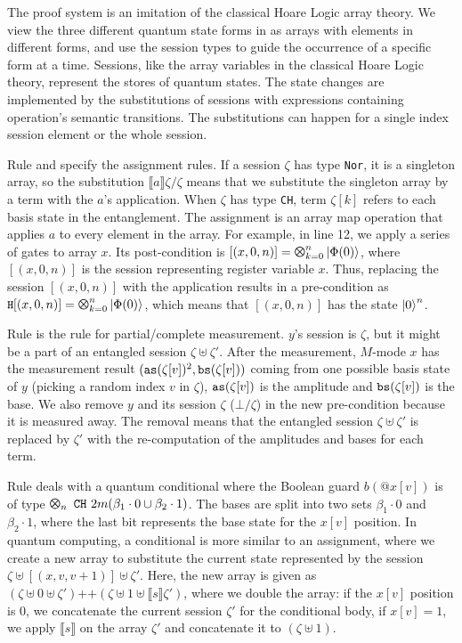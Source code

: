 The proof system is an imitation of the classical Hoare Logic array theory.
We view the three different quantum state forms in  as arrays with elements in different forms,
and use the session types to guide the occurrence of a specific form at a time.
Sessions, like the array variables in the classical Hoare Logic theory,
represent the stores of quantum states.
The state changes are implemented by the substitutions of sessions
with expressions containing operation's semantic transitions.
The substitutions can happen for a single index session element or the whole session.

Rule  and  specify the assignment rules.
If a session $\zeta$ has type \texttt{Nor}, it is a singleton array,
so the substitution $\llbracket a \rrbracket \zeta /\zeta$ means
that we substitute the singleton array by a term with the $a$'s application.
When $\zeta$ has type \texttt{CH}, term $\zeta[k]$ refers to each basis state in the entanglement.
The assignment is an array map operation that applies $a$ to every element in the array.
For example, in  line 12,
we apply a series of  gates to array $x$.
Its post-condition is $[(x,0,n)]=\Motimes_{k=0}^{n}\ket{\Phi(0)}$,
where $[(x,0,n)]$ is the session representing register variable $x$.
Thus, replacing the session $[(x,0,n)]$ with the  application
results in a pre-condition as $\code{H}[(x,0,n)]=\Motimes_{k=0}^{n}\ket{\Phi(0)}$,
which means that $[(x,0,n)]$ has the state $\left\vert{0}\right\rangle^n$.

Rule  is the rule for partial/complete measurement.
$y$'s session is $\zeta$, but it might be a part of an entangled session $\zeta\uplus\zeta'$.
After the measurement, $M$-mode $x$ has the measurement result $(\texttt{as}(\zeta[v])^2,\texttt{bs}(\zeta[v]))$ coming
from one possible basis state of $y$ (picking a random index $v$ in $\zeta$), 
$\texttt{as}(\zeta[v])$ is the amplitude and $\texttt{bs}(\zeta[v])$ is the base.
We also remove $y$ and its session $\zeta$ ($\bot/\zeta$) in the new pre-condition because it is measured away.
The removal means that the entangled session $\zeta\uplus\zeta'$ is replaced by $\zeta'$ 
with the re-computation of the amplitudes and bases for each term.

Rule  deals with a quantum conditional where the Boolean guard $b(@x[v])$ is of type $\ttype{n}{\tch{2m}{(\beta_1\cdot 0 \cup \beta_2\cdot 1)}}$. The bases are split into two sets $\beta_1\cdot 0$ and $\beta_2\cdot 1$, where the last bit represents the base state for the $x[v]$ position.
In quantum computing, a conditional is more similar to an assignment, where we create a new array to substitute 
the current state represented by the session $\zeta\uplus[(x,v,v+1)]\uplus\zeta'$.
Here, the new array is given as $(\zeta\uplus 0 \uplus \zeta')\texttt{++}(\zeta\uplus 1 \uplus \llbracket s \rrbracket\zeta')$,
where we double the array: if the $x[v]$ position is $0$, we concatenate the current session $\zeta'$ for the conditional body,
if $x[v]=1$, we apply $\llbracket s \rrbracket$ on the array $\zeta'$ and concatenate it to $(\zeta\uplus 1)$.

